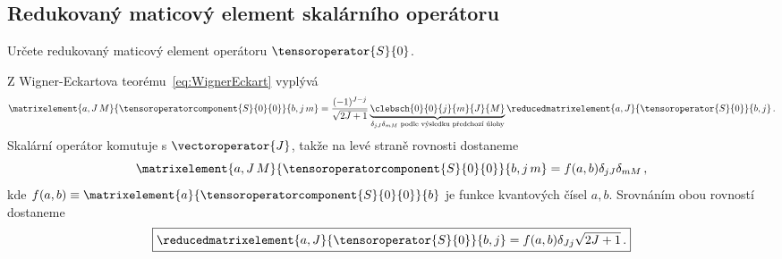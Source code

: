 \subsection{Redukovaný maticový element skalárního operátoru}
	Určete redukovaný maticový element operátoru $\tensoroperator{S}{0}$.

\begin{solution}
	Z Wigner-Eckartova teorému~\eqref{eq:WignerEckart} vyplývá
	\begin{equation}
		\matrixelement{a,J\,M}{\tensoroperatorcomponent{S}{0}{0}}{b,j\,m}
			=\frac{(-1)^{J-j}}{\sqrt{2J+1}}\underbrace{\clebsch{0}{0}{j}{m}{J}{M}}
				_{\delta_{jJ}\delta_{mM}\text{ podle výsledku předchozí úlohy}}
				\reducedmatrixelement{a,J}{\tensoroperator{S}{0}}{b,j}\,.
	\end{equation}
	Skalární operátor komutuje s $\vectoroperator{J}$, takže na levé straně rovnosti dostaneme
	\begin{equation}
		\matrixelement{a,J\,M}{\tensoroperatorcomponent{S}{0}{0}}{b,j\,m}=f(a,b)\delta_{jJ}\delta_{mM}\,,
	\end{equation}
	kde $f(a,b)\equiv\matrixelement{a}{\tensoroperatorcomponent{S}{0}{0}}{b}$ je funkce  kvantových čísel 
	$a,b$.
	Srovnáním obou rovností dostaneme
	\begin{equation}
		\boxed{
			\reducedmatrixelement{a,J}{\tensoroperator{S}{0}}{b,j}=f(a,b)\delta_{Jj}\sqrt{2J+1}\,.
		}
	\end{equation}
\end{solution}